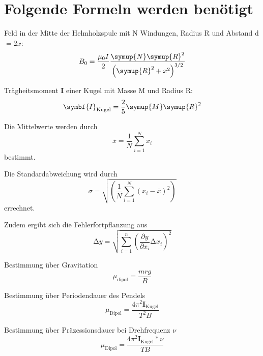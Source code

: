 \section{Folgende Formeln werden benötigt}
Feld in der Mitte der Helmholzspule mit N Windungen, Radius R und Abstand d $=2x$:
\begin{equation}
  B_0 = \frac{\mu_0I}{2}\frac{\symup{N}\symup{R}^2}{\left(\symup{R}^2+x^2\right)^{3/2}}
  \label{eqn:b0}
\end{equation}

Trägheitsmoment $\symbf{I}$ einer Kugel mit Masse M und Radius R:
\begin{equation}
  \symbf{I}_\text{Kugel}=\frac{2}{5}\symup{M}\symup{R}^2
  \label{eqn:Ik}
\end{equation}

Die Mittelwerte werden durch
\begin{equation}
  \overline{x} =\frac{1}{N}\sum_{i=1}^{N} x_i
  \label{eqn:mean}
\end{equation}
bestimmt.

Die Standardabweichung wird durch
\begin{equation}
  \sigma = \sqrt{\left(\frac{1}{N}\sum_{i=1}^{N}(x_i-\overline{x})^2\right)}
  \label{eqn:std}
\end{equation}
 errechnet.

Zudem ergibt sich die Fehlerfortpflanzung aus
\begin{equation}
 \increment y = \sqrt{\sum_{i=1}^{n}\left(\frac{\partial y}{\partial x_i}
 \increment x_i\right)^2}
 \label{eqn:gauss}
\end{equation}

Bestimmung über Gravitation
\begin{equation}
  \mu_\text{dipol}=\frac{mrg}{B}
  \label{eqn:grav}
\end{equation}

Bestimmung über Periodendauer des Pendels
\begin{equation}
  \mu_\text{Dipol}=\frac{4\pi^2\symbf{I}_\text{Kugel}}{T^2B}
  \label{eqn:pendel}
\end{equation}

Bestimmung über Präzessionsdauer bei Drehfrequenz $\nu$
\begin{equation}
  \mu_\text{Dipol}=\frac{4\pi^2\symbf{I}_\text{Kugel}*\nu}{TB}
  \label{eqn:strobo}
\end{equation}
